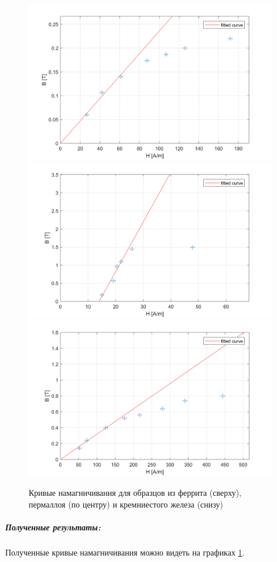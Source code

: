 \documentclass[a4paper,12pt]{article}
\begin{document}
\begin{figure}[ht]
\centering
\includegraphics[width=110mm]{PlotFerrit.png}
\includegraphics[width=110mm]{PlotPermalloy.png}
\includegraphics[width=110mm]{PlotKrem_Ferr.png}
\caption{Кривые намагничивания для образцов из феррита (сверху), пермаллоя (по центру) и кремниестого железа (снизу)}\label{graphs}
\end{figure}



\subparagraph{Полученные результаты:}

Полученные кривые намагничивания можно видеть на графиках \ref{graphs}.
\end{document}

